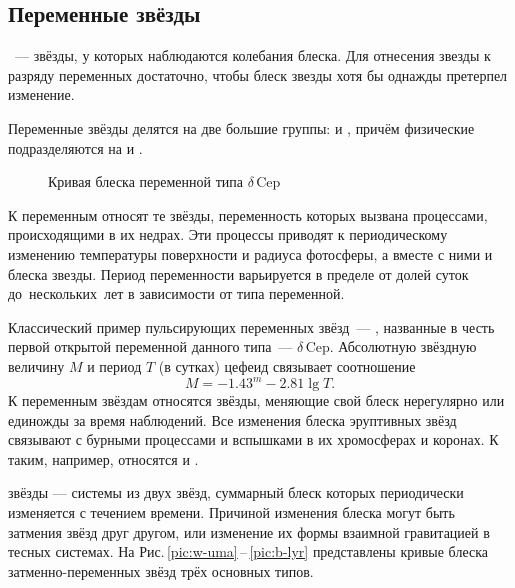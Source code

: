 \subsection{Переменные звёзды}
~--- звёзды, у которых наблюдаются колебания блеска.   Для отнесения звезды к разряду переменных достаточно, чтобы блеск звезды хотя бы однажды претерпел изменение.

Переменные звёзды делятся на две большие группы:  и , причём физические подразделяются на  и .

\begin{wrapfigure}[11]{l}{0.5\tw}
	\centering
	\vspace{-1.2pc}
 	\caption{Кривая блеска переменной типа $\delta$\,Cep}
 	\label{pic:d-cep}
\end{wrapfigure}
К  переменным  относят те звёзды, переменность которых вызвана процессами, происходящими в их недрах. Эти процессы приводят к периодическому изменению температуры поверхности и радиуса фотосферы, а вместе с ними и блеска звезды. Период переменности варьируется в пределе от долей суток до~нескольких~лет в зависимости от типа переменной. 

Классический пример пульсирующих переменных звёзд~--- , названные в честь первой открытой переменной данного типа~--- $\delta$\,Cep. Абсолютную звёздную величину $M$ и период $T$ (в сутках) цефеид связывает соотношение
\begin{equation}
	M = -1.43^m - 2.81\lg T.
\end{equation}
К  переменным звёздам относятся звёзды, меняющие свой блеск нерегулярно или единожды за время наблюдений. Все изменения блеска эруптивных звёзд связывают с бурными процессами и вспышками в их хромосферах и коронах. К таким, например, относятся  и .

 звёзды --- системы из двух звёзд, суммарный блеск которых периодически изменяется с течением времени. Причиной изменения блеска могут быть затмения звёзд друг другом, или изменение их формы взаимной гравитацией в тесных системах. На Рис.\,\ref{pic:w-uma}\,--\,\ref{pic:b-lyr}  представлены кривые блеска затменно-переменных звёзд трёх основных типов.

